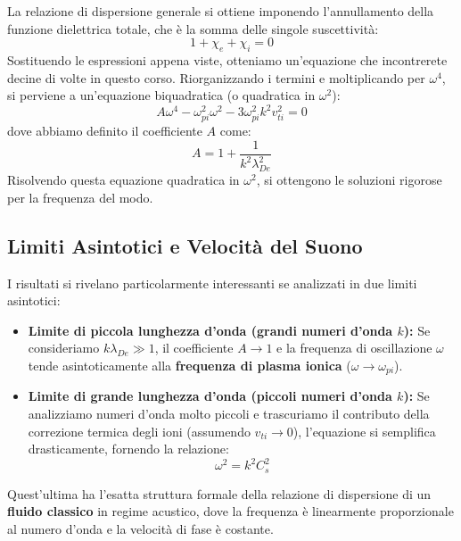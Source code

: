 La relazione di dispersione generale si ottiene imponendo l'annullamento della funzione dielettrica totale, che è la somma delle singole suscettività:
\begin{equation}
1 + \chi_e + \chi_i = 0
\end{equation}
Sostituendo le espressioni appena viste, otteniamo un'equazione che incontrerete decine di volte in questo corso. Riorganizzando i termini e moltiplicando per $\omega^4$, si perviene a un'equazione biquadratica (o quadratica in $\omega^2$):
\begin{equation}
A \omega^4 - \omega_{pi}^2 \omega^2 - 3 \omega_{pi}^2 k^2 v_{ti}^2 = 0
\end{equation}
dove abbiamo definito il coefficiente $A$ come:
\begin{equation}
A = 1 + \frac{1}{k^2 \lambda_{De}^2}
\end{equation}
Risolvendo questa equazione quadratica in $\omega^2$, si ottengono le soluzioni rigorose per la frequenza del modo.

\subsection{Limiti Asintotici e Velocità del Suono}
I risultati si rivelano particolarmente interessanti se analizzati in due limiti asintotici:
\begin{itemize}
\item \textbf{Limite di piccola lunghezza d'onda (grandi numeri d'onda $k$):} Se consideriamo $k \lambda_{De} \gg 1$, il coefficiente $A \to 1$ e la frequenza di oscillazione $\omega$ tende asintoticamente alla \textbf{frequenza di plasma ionica} ($\omega \to \omega_{pi}$).
\item \textbf{Limite di grande lunghezza d'onda (piccoli numeri d'onda $k$):} Se analizziamo numeri d'onda molto piccoli e trascuriamo il contributo della correzione termica degli ioni (assumendo $v_{ti} \to 0$), l'equazione si semplifica drasticamente, fornendo la relazione:
\begin{equation}
\omega^2 = k^2 C_s^2
\end{equation}
\end{itemize}
Quest'ultima ha l'esatta struttura formale della relazione di dispersione di un \textbf{fluido classico} in regime acustico, dove la frequenza è linearmente proporzionale al numero d'onda e la velocità di fase è costante.

